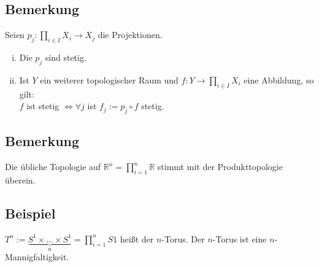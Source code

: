 \subsection[Bemerkung zur Stetigkeit der Projektionen und Stetigkeit im Produktraum]{Bemerkung} %
\label{sub:25}
Seien $p_j : \prod_{i \in I} X_i \to X_j$ die Projektionen.
\begin{enumerate}[(i)]
	\item Die $p_j$ sind stetig.
	\item Ist $Y$ ein weiterer topologischer Raum und $f : Y \to \prod_{i \in I} X_i$ eine Abbildung, so gilt: \\
	$f$ ist stetig $\iff \forall j $ ist $f_j := p_j \circ f$ stetig.
\end{enumerate}

\subsection[Bemerkung zur üblichen Topologie auf $\mathds{R}^n$]{Bemerkung} %
\label{sub:26}
Die übliche Topologie auf $\mathds{R}^n = \prod_{i =1}^n \mathds{R}$ stimmt mit der Produkttopologie überein.
\newpage

\subsection[Beispiel: Torus]{Beispiel} %
\label{sub:27}
\begin{figure}[h]
\end{figure}
$T^n := \underbrace{S^1 \times \ldots \times S^1}_{n} = \prod_{i=1}^n S1$ heißt der $n$-Torus. Der $n$-Torus ist eine $n$-Mannigfaltigkeit.



